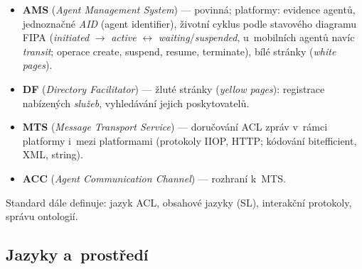 \documentclass[11pt,a4paper]{article}
\theoremstyle{definition}
\begin{document}
\begin{defbox}
\begin{itemize}
\item \textbf{AMS} (\emph{Agent Management System}) --- povinná;  platformy:
  evidence agentů, jednoznačné \emph{AID} (agent identifier), životní cyklus podle
  stavového diagramu FIPA (\emph{initiated} $\to$ \emph{active} $\leftrightarrow$
  \emph{waiting}/\emph{suspended}, u~mobilních agentů navíc \emph{transit}; operace create,
  suspend, resume, terminate), bílé stránky (\emph{white pages}).
\item \textbf{DF} (\emph{Directory Facilitator}) --- žluté stránky (\emph{yellow pages}):
  registrace nabízených \emph{služeb}, vyhledávání jejich poskytovatelů.
\item \textbf{MTS} (\emph{Message Transport Service}) --- doručování ACL zpráv v~rámci
  platformy i~mezi platformami (protokoly IIOP, HTTP; kódování bitefficient, XML, string).
\item \textbf{ACC} (\emph{Agent Communication Channel}) --- rozhraní k~MTS.
\end{itemize}
Standard dále definuje: jazyk ACL, obsahové jazyky (SL), interakční protokoly, správu
ontologií.
\end{defbox}

\subsection{Jazyky a~prostředí}
\end{document}
